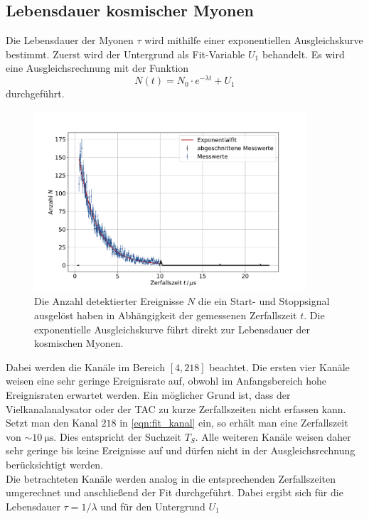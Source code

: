 \subsection{Lebensdauer kosmischer Myonen}
Die Lebensdauer der Myonen $\tau$ wird mithilfe einer exponentiellen Ausgleichskurve bestimmt.
Zuerst wird der Untergrund als Fit-Variable $U_1$ behandelt.
Es wird eine Ausgleichsrechnung mit der Funktion
\begin{equation}
    N(t) = N_0 \cdot e^{- \lambda t} + U_1
\end{equation}
durchgeführt.
\begin{figure}
    \centering
    \includegraphics[width=0.9\textwidth]{content/plots/lifetime.pdf}
    \caption{Die Anzahl detektierter Ereignisse $N$ die ein Start- und Stoppsignal ausgelöst haben in Abhängigkeit der gemessenen Zerfallszeit $t$.
    Die exponentielle Ausgleichskurve führt direkt zur Lebensdauer der kosmischen Myonen.
    }
    \label{fig:lebensdauer1}
\end{figure}
Dabei werden die Kanäle im Bereich $[4, 218]$ beachtet.
Die ersten vier Kanäle weisen eine sehr geringe Ereignisrate auf, obwohl im Anfangsbereich hohe Ereignisraten erwartet werden.
Ein möglicher Grund ist, dass der Vielkanalanalysator oder der TAC zu kurze Zerfallszeiten nicht erfassen kann.
Setzt man den Kanal $218$ in \autoref{eqn:fit_kanal} ein, so erhält man eine Zerfallszeit von $\sim \qty{10}{\micro\second}$.
Dies entspricht der Suchzeit $T_S$.
Alle weiteren Kanäle weisen daher sehr geringe bis keine Ereignisse auf und dürfen nicht in der Ausgleichsrechnung berücksichtigt werden.
\\
Die betrachteten Kanäle werden analog in die entsprechenden Zerfallszeiten umgerechnet und anschließend der Fit durchgeführt.
Dabei ergibt sich für die Lebensdauer $\tau = 1/\lambda$ und für den Untergrund $U_1$
